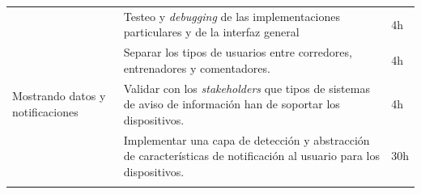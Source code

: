 \begin{longtable}[c]{@{}lll@{}}
\begin{minipage}[t]{0.28\columnwidth}\raggedright
\end{minipage} & \begin{minipage}[t]{0.62\columnwidth}\raggedright
Testeo y \emph{debugging} de las implementaciones particulares y de la
interfaz general
\end{minipage} & \begin{minipage}[t]{0.10\columnwidth}\raggedright
4h
\end{minipage}
\\\noalign{\medskip}
\begin{minipage}[t]{0.28\columnwidth}\raggedright
\end{minipage} & \begin{minipage}[t]{0.62\columnwidth}\raggedright
Separar los tipos de usuarios entre corredores, entrenadores y
comentadores.
\end{minipage} & \begin{minipage}[t]{0.10\columnwidth}\raggedright
4h
\end{minipage}
\\\noalign{\medskip}
\begin{minipage}[t]{0.28\columnwidth}\raggedright
Mostrando datos y notificaciones
\end{minipage} & \begin{minipage}[t]{0.62\columnwidth}\raggedright
Validar con los \emph{stakeholders} que tipos de sistemas de aviso de
información han de soportar los dispositivos.
\end{minipage} & \begin{minipage}[t]{0.10\columnwidth}\raggedright
4h
\end{minipage}
\\\noalign{\medskip}
\begin{minipage}[t]{0.28\columnwidth}\raggedright
\end{minipage} & \begin{minipage}[t]{0.62\columnwidth}\raggedright
Implementar una capa de detección y abstracción de características de
notificación al usuario para los dispositivos.
\end{minipage} & \begin{minipage}[t]{0.10\columnwidth}\raggedright
30h
\end{minipage}
\\\noalign{\medskip}
\begin{minipage}[t]{0.28\columnwidth}\raggedright
\end{minipage} & \begin{minipage}[t]{0.62\columnwidth}\raggedright

\end{minipage}
\end{longtable}
